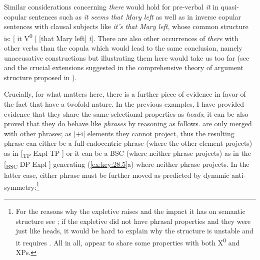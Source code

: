 \documentclass[output=paper]{langsci/langscibook}
\begin{document}
Similar considerations concerning \emph{there} would hold for pre-verbal
\emph{it} in quasi-copular sentences such as \emph{it seems that Mary left} as
well as in inverse copular sentences with clausal subjects like \emph{it's that
Mary left}, whose common structure is: [ it V\textsuperscript{0} [ [that Mary
left] \emph{t}]. There are also other occurrences of \emph{there} with other
verbs than the copula which would lead to the same conclusion, namely
unaccusative constructions but illustrating them here would take us too far
(see \citealt{Moro1997} and the crucial extensions suggested in the
comprehensive theory of argument structure proposed in
\citealt{HaleKeyser2002}).

Crucially, for what matters here, there is a further piece of evidence in favor
of the fact that  have a twofold nature. In the previous examples, I
have provided evidence that they share the same selectional properties as
\emph{heads}; it can be also proved that they do behave like \emph{phrases} by
reasoning as follows.  are only merged with other phrases; as [+i]
elements they cannot project, thus the resulting phrase can either be a full
endocentric phrase (where the other element projects) as in [\textsubscript{TP}
Expl TP ] or it can be a \gls{BSC} (where neither phrase projects) as in the
[\textsubscript{BSC} DP Expl ] generating (\ref{ex:key:28.5}a) where neither
phrase projects. In the latter case, either phrase must be further moved as
predicted by dynamic anti-symmetry\@:\footnote{For the reasons why the expletive
    raises and the impact it has on semantic structure see
    \textcites[Ch.\ 3]{Moro1997}{Moro2000}{Moro2009};
    \citet{Chomsky2013,Chomsky2017,ChoGalOtt2019,Rizzi2015,Rizzi2016}
    if the expletive did not have phrasal properties and they were just like
    heads, it would be hard to explain why the structure is unstable and it
requires . All in all,  appear to share some properties with
both X\textsuperscript{0} and XPs.}
\end{document}
